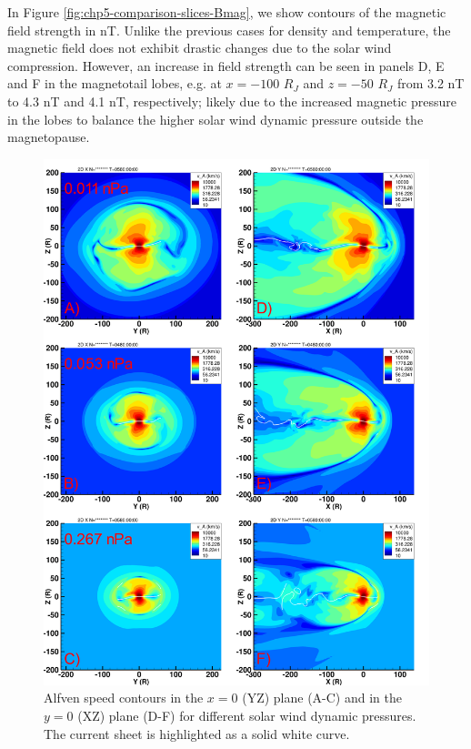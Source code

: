 In Figure \ref{fig:chp5-comparison-slices-Bmag}, we show contours of the magnetic field strength in nT. Unlike the previous cases for density and temperature, the magnetic field does not exhibit drastic changes due to the solar wind compression. However, an increase in field strength can be seen in panels D, E and F in the magnetotail lobes, e.g. at $x=-100$ $R_J$ and $z=-50$ $R_J$ from 3.2 nT to 4.3 nT and 4.1 nT, respectively; likely due to the increased magnetic pressure in the lobes to balance the higher solar wind dynamic pressure outside the magnetopause. 

\begin{figure}
    \centering
    \includegraphics[height=0.9\textheight]{images5/compare_runs_currentsheet_AlfvenSpeed.png}
    \caption{Alfven speed contours in the $x=0$ (YZ) plane (A-C) and in the $y=0$ (XZ) plane (D-F) for different solar wind dynamic pressures. The current sheet is highlighted as a solid white curve.}
    \label{fig:chp5-comparison-slices-alfven}
\end{figure}

